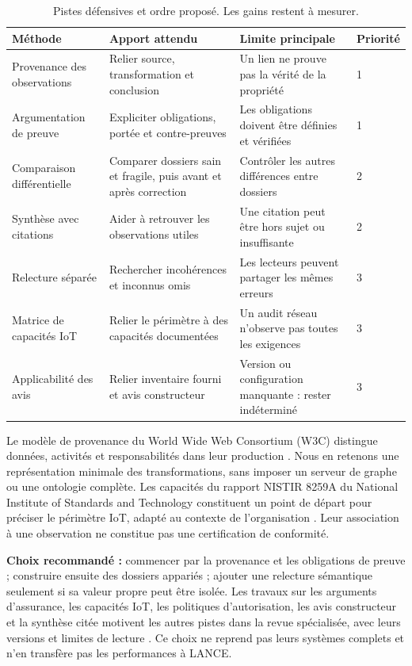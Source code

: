 \documentclass[11pt,a4paper]{article}
\begin{document}
\begin{table}[htbp]
\centering\small
\begin{tabularx}{\linewidth}{@{}>{\raggedright\arraybackslash}p{3.15cm}YYp{1.25cm}@{}}
\toprule
Méthode & Apport attendu & Limite principale & Priorité\\
\midrule
Provenance des observations & Relier source, transformation et conclusion & Un lien ne prouve pas la vérité de la propriété & 1\\[3pt]
Argumentation de preuve & Expliciter obligations, portée et contre-preuves & Les obligations doivent être définies et vérifiées & 1\\[3pt]
Comparaison différentielle & Comparer dossiers sain et fragile, puis avant et après correction & Contrôler les autres différences entre dossiers & 2\\[3pt]
Synthèse avec citations & Aider à retrouver les observations utiles & Une citation peut être hors sujet ou insuffisante & 2\\[3pt]
Relecture séparée & Rechercher incohérences et inconnus omis & Les lecteurs peuvent partager les mêmes erreurs & 3\\[3pt]
Matrice de capacités IoT & Relier le périmètre à des capacités documentées & Un audit réseau n'observe pas toutes les exigences & 3\\[3pt]
Applicabilité des avis & Relier inventaire fourni et avis constructeur & Version ou configuration manquante : rester indéterminé & 3\\
\bottomrule
\end{tabularx}
\caption{Pistes défensives et ordre proposé. Les gains restent à mesurer.}
\label{tab:methodes}
\end{table}

Le modèle de provenance du World Wide Web Consortium (W3C) distingue données,
activités et responsabilités
dans leur production \cite{prov}. Nous en retenons une représentation minimale
des transformations, sans imposer un serveur de graphe ou une ontologie complète.
Les capacités du rapport NISTIR 8259A du National Institute of Standards and
Technology constituent un point de départ pour préciser
le périmètre IoT, adapté au contexte de l'organisation \cite{nist}. Leur
association à une observation ne constitue pas une certification de conformité.

\textbf{Choix recommandé :} commencer par la provenance et les obligations de
preuve ; construire ensuite des dossiers appariés ; ajouter une relecture
sémantique seulement si sa valeur propre peut être isolée. Les travaux sur les
arguments d'assurance, les capacités IoT, les politiques d'autorisation, les
avis constructeur et la synthèse citée motivent les autres pistes dans la revue spécialisée,
avec leurs versions et limites de lecture \cite{methodes}. Ce choix ne reprend
pas leurs systèmes complets et n'en transfère pas les performances à LANCE.
\end{document}
